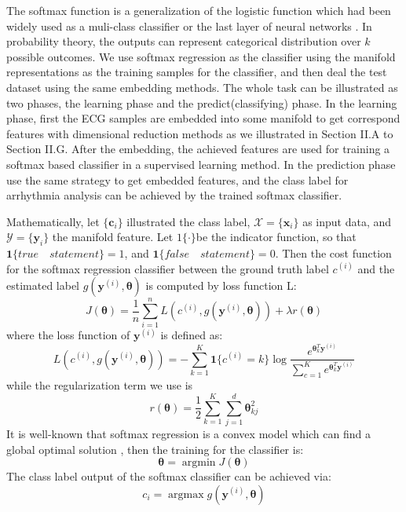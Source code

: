 \documentclass[journal]{IEEEtran}
\DeclareMathOperator*{\argmax}{argmax}
\DeclareMathOperator*{\argmin}{argmin}
\begin{document}
The softmax function is a generalization of the logistic function which had been widely used as a muli-class classifier or the last layer of neural networks \cite{christopher2006pattern}.
In probability theory, the outputs can represent categorical distribution over $k$ possible outcomes.
We use softmax regression as the classifier using the manifold representations as the training samples for the classifier, and then deal the test dataset using the same embedding methods.
The whole task can be illustrated as two phases, the learning phase and the predict(classifying) phase.
In the learning phase, first the ECG samples are embedded into some manifold to get correspond features with dimensional reduction methods as we illustrated in Section II.A to Section II.G.
After the embedding, the achieved  features are used for training a softmax based classifier in a supervised learning method. 
In the prediction phase use the same strategy to get embedded features, and the class label for arrhythmia analysis can be achieved by the trained softmax classifier.
 
Mathematically, let $\{\bm{c}_i\}$ illustrated the class label, $\mathcal{X} = \{\bm{x}_i\}$ as input data, and  $\mathcal{Y} = \{\bm{y}_i\}$ the manifold feature.
Let $1\{\cdot\}$be the indicator function, so that $\bm{1}\{true \quad statement\} = 1$, and $\bm{1}\{false \quad statement\} = 0$. 
Then the cost function for the softmax regression classifier between the ground truth label $c^{(i)}$ and the estimated label $g(\bm{y}^{(i)}, \bm{\theta})$ is computed by loss function L:
\begin{equation}
J(\bm{\theta}) = \frac{1}{n}\sum_{i=1}^nL(c^{(i)}, g(\bm{y}^{(i)}, \bm{\theta})) + \lambda r(\bm{\theta})
\end{equation}
where the loss function of $\bm{y}^{(i)}$ is defined as:
\begin{equation}
L(c^{(i)}, g(\bm{y}^{(i)}, \bm{\theta})) = -\sum_{k=1}^K\bm{1}\{c^{(i)} = k\} \log \frac{e^{\bm{\theta}_k^T\bm{y}^{(i)}}}{\sum_{c=1}^Ke^{\bm{\theta}_k^T\bm{y}^{(i)}} }
\end{equation}
while the regularization term we use is
\begin{equation}
r(\bm{\theta}) = \frac{1}{2} \sum_{k=1}^K\sum_{j=1}^d \bm{\theta}_{kj}^2
\end{equation}
It is well-known that softmax regression is a convex model which can find a global optimal solution \cite{ren2017robust}, then the training for the classifier is:
\begin{equation}
\bm{\theta} = \argmin J(\bm{\theta})
\end{equation}
The class label output of the softmax classifier can be achieved via:
\begin{equation}
c_i = \argmax g(\bm{y}^{(i)}, \bm{\theta}) 
\end{equation}
\end{document}
